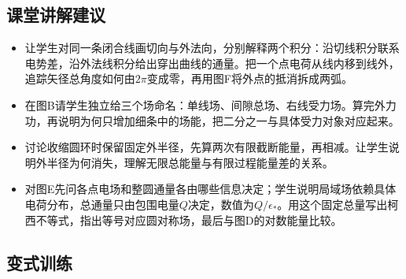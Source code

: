 \documentclass[UTF8,fontset=fandol,a4paper,11pt]{ctexart}
\begin{document}


\subsection*{课堂讲解建议}

\begin{itemize}
\item 让学生对同一条闭合线画切向与外法向，分别解释两个积分：沿切线积分联系电势差，沿外法线积分给出穿出曲线的通量。把一个点电荷从线内移到线外，追踪矢径总角度如何由$2\pi$变成零，再用图F将外点的抵消拆成两弧。
\item 在图B请学生独立给三个场命名：单线场、间隙总场、右线受力场。算完外力功，再说明为何只增加细条中的场能，把二分之一与具体受力对象对应起来。
\item 讨论收缩圆环时保留固定外半径，先算两次有限截断能量，再相减。让学生说明外半径为何消失，理解无限总能量与有限过程能量差的关系。
\item 对图E先问各点电场和整圆通量各由哪些信息决定；学生说明局域场依赖具体电荷分布，总通量只由包围电量$Q$决定，数值为$Q/\epsilon_*$。用这个固定总量写出柯西不等式，指出等号对应圆对称场，最后与图D的对数能量比较。
\end{itemize}



\subsection*{变式训练}
\end{document}
